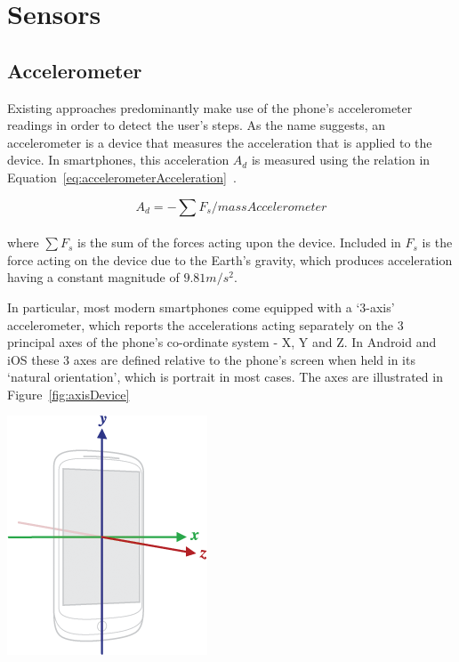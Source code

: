 \documentclass[12pt,a4paper]{report}
\begin{document}
\section{Sensors}

\subsection{Accelerometer}
Existing approaches predominantly make use of the phone's accelerometer readings in order to detect the user's steps. As the name suggests, an accelerometer is a device that measures the acceleration that is applied to the device. In smartphones, this acceleration $A_{d}$ is measured using the relation in 
Equation~\ref{eq:accelerometerAcceleration}~\cite{accelerometerAcceleration}.  

\begin{equation}\label{eq:accelerometerAcceleration}
A_{d} = - \sum F_{s}/massAccelerometer
\end{equation}
\\
where $\sum F_{s}$ is the sum of the forces acting upon the device. Included in $F_{s}$ is the force acting on the device due to the Earth's gravity, which produces acceleration having a constant magnitude of $9.81 m/s^2$. 

In particular, most modern smartphones come equipped with a `3-axis' accelerometer, which reports the accelerations acting separately on the 3 principal axes of the phone's co-ordinate system - X, Y and Z. In Android and iOS these 3 axes are defined relative to the phone's screen when held in its `natural orientation', which is portrait in most cases. The axes are illustrated in Figure~\ref{fig:axisDevice}

\begin{center}
\includegraphics[scale=0.5]{images/axisDevice.png}
\label{fig:axisDevice}
\end{center}
\end{document}

